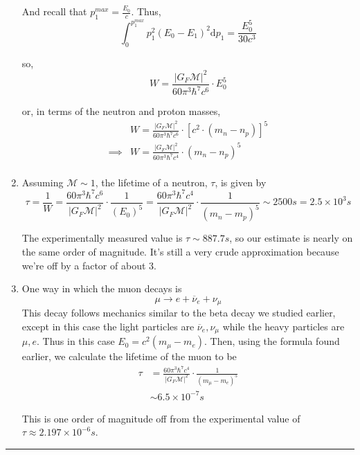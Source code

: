 \documentclass{article}
\begin{document}
\begin{enumerate}[label=(\alph*)]
  And recall that $p_1^{max} = \frac{E_0}{c}$. Thus,
  \[ \int_0^{{p_1^{max}}} p_1^2 (E_0 - E_1)^2 \mathrm{d}p_1 = \frac{E_0^5}{30c^3} \]

  so, 
  \[ \boxed{W = \frac{\left|G_F \mathcal{M}\right|^2}{60 \pi^3 \hbar^7 c^6} \cdot E_0^5}  \]

  or, in terms of the neutron and proton masses, 
  \begin{align*}
    &W = \frac{\left|G_F \mathcal{M}\right|^2}{60 \pi^3 \hbar^7 c^6} \cdot [c^2\cdot(m_n - n_p)]^5 \\
    \implies& \boxed{W = \frac{\left|G_F \mathcal{M}\right|^2}{60 \pi^3 \hbar^7 c^4} \cdot(m_n - n_p)^5} \\
  \end{align*}

  \vskip 0.5cm
  \item Assuming $\mathcal{M} \sim 1$, the lifetime of a neutron, $\tau$, is given by
  \[ \tau = \frac{1}{W} = \frac{60 \pi^3 \hbar^7 c^6}{\left|G_F \mathcal{M}\right|^2} \cdot \frac{1}{(E_0)^5} = \frac{60 \pi^3 \hbar^7 c^4}{\left|G_F \mathcal{M}\right|^2} \cdot \frac{1}{(m_n - m_p)^5} \sim 2500s = 2.5 \times 10^3s \]

  The experimentally measured value is $\tau \sim 887.7s$, so our estimate is nearly on the same order of magnitude. It's still a very crude approximation because we're off by a factor of about 3.

  \vskip 0.5cm
  \item One way in which the muon decays is
  \[ \mu \rightarrow e + \overline{\nu}_e + \nu_{\mu}  \]
  This decay follows mechanics similar to the beta decay we studied earlier, except in this case the light particles are $\overline{\nu}_{e}, \nu_{\mu}$ while the heavy particles are $\mu, e$. Thus in this case $E_0 = c^2\left(m_{\mu} - m_e\right)$. Then, using the formula found earlier, we calculate the lifetime of the muon to be 
  \begin{align*}
    \tau &= \frac{60 \pi^3 \hbar^7 c^4}{\left|G_F \mathcal{M}\right|^2} \cdot \frac{1}{(m_{\mu} - m_e)^5} \\
    &\sim 6.5 \times 10^{-7}s
  \end{align*}

  This is one order of magnitude off from the experimental value of $\tau \approx 2.197 \times 10^{-6}s$.

  \end{enumerate}

\vskip 0.5cm 
\hrule 
\vskip 0.5cm
\end{document}
